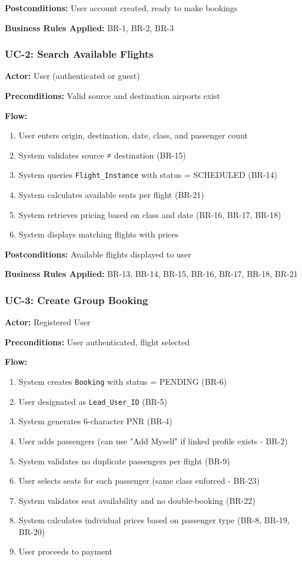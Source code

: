 \documentclass[12pt,a4paper,openany]{report}
\begin{document}
\textbf{Postconditions:} User account created, ready to make bookings

\textbf{Business Rules Applied:} BR-1, BR-2, BR-3

\subsubsection{UC-2: Search Available Flights}
\textbf{Actor:} User (authenticated or guest)

\textbf{Preconditions:} Valid source and destination airports exist

\textbf{Flow:}
\begin{enumerate}
    \item User enters origin, destination, date, class, and passenger count
    \item System validates source ≠ destination (BR-15)
    \item System queries \texttt{Flight\_Instance} with status = SCHEDULED (BR-14)
    \item System calculates available seats per flight (BR-21)
    \item System retrieves pricing based on class and date (BR-16, BR-17, BR-18)
    \item System displays matching flights with prices
\end{enumerate}

\textbf{Postconditions:} Available flights displayed to user

\textbf{Business Rules Applied:} BR-13, BR-14, BR-15, BR-16, BR-17, BR-18, BR-21

\subsubsection{UC-3: Create Group Booking}
\textbf{Actor:} Registered User

\textbf{Preconditions:} User authenticated, flight selected

\textbf{Flow:}
\begin{enumerate}
    \item System creates \texttt{Booking} with status = PENDING (BR-6)
    \item User designated as \texttt{Lead\_User\_ID} (BR-5)
    \item System generates 6-character PNR (BR-4)
    \item User adds passengers (can use "Add Myself" if linked profile exists - BR-2)
    \item System validates no duplicate passengers per flight (BR-9)
    \item User selects seats for each passenger (same class enforced - BR-23)
    \item System validates seat availability and no double-booking (BR-22)
    \item System calculates individual prices based on passenger type (BR-8, BR-19, BR-20)
    \item User proceeds to payment
\end{enumerate}
\end{document}
